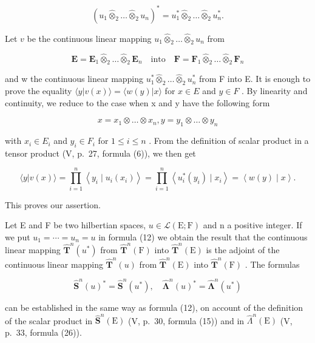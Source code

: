 \[
(u _ {1} \hat {\otimes} _ {2} \dots \hat {\otimes} _ {2} u _ {n}) ^ {*} = u _ {1} ^ {*} \hat {\otimes} _ {2} \dots \hat {\otimes} _ {2} u _ {n} ^ {*}.\tag{12}
\]

Let \(v\) be the continuous linear mapping \(u_1 \hat{\otimes}_2 \ldots \hat{\otimes}_2 u_n\) from

\[
\mathbf {E} = \mathbf {E} _ {1} \hat {\otimes} _ {2} \dots \hat {\otimes} _ {2} \mathbf {E} _ {n} \quad \text {into} \quad \mathbf {F} = \mathbf {F} _ {1} \hat {\otimes} _ {2} \dots \hat {\otimes} _ {2} \mathbf {F} _ {n}
\]

and w the continuous linear mapping \(u_{1}^{*}\hat{\otimes}_{2}\ldots\hat{\otimes}_{2}u_{n}^{*}\) from F into E. It is enough to prove the equality \(\langle y|v(x)\rangle=\langle w(y)|x\rangle\) for \(x\in E\) and \(y\in F\) . By linearity and continuity, we reduce to the case when x and y have the following form

\[
x = x _ {1} \otimes \ldots \otimes x _ {n}, y = y _ {1} \otimes \ldots \otimes y _ {n}
\]

with \(x_{i} \in E_{i}\) and \(y_{i} \in F_{i}\) for \(1 \leqslant i \leqslant n\) . From the definition of scalar product in a tensor product (V, p.~27, formula (6)), we then get

\[
\langle y | v (x) \rangle = \prod_ {i = 1} ^ {n} \left\langle y _ {i} \mid u _ {i} \left(x _ {i}\right) \right\rangle = \prod_ {i = 1} ^ {n} \left\langle u _ {i} ^ {*} \left(y _ {i}\right) \mid x _ {i} \right\rangle = \left\langle w (y) \mid x \right\rangle .
\]

This proves our assertion.

Let E and F be two hilbertian spaces, \(u \in \mathcal{L}(\mathrm{E}; \mathrm{F})\) and n a positive integer. If we put \(u_{1} = \cdots = u_{n} = u\) in formula (12) we obtain the result that the continuous linear mapping \(\hat{\mathbf{T}}^{n}(u^{*})\) from \(\hat{\mathbf{T}}^{n}(\mathrm{F})\) into \(\hat{\mathbf{T}}^{n}(\mathrm{E})\) is the adjoint of the continuous linear mapping \(\hat{\mathbf{T}}^{n}(u)\) from \(\hat{\mathbf{T}}^{n}(\mathrm{E})\) into \(\hat{\mathbf{T}}^{n}(\mathrm{F})\) . The formulas

\[
\hat {\mathbf {S}} ^ {n} (u) ^ {*} = \hat {\mathbf {S}} ^ {n} (u ^ {*}), \quad \hat {\symbf {\Lambda}} ^ {n} (u) ^ {*} = \hat {\symbf {\Lambda}} ^ {n} (u ^ {*})\tag{13}
\]

can be established in the same way as formula (12), on account of the definition of the scalar product in \(\hat{\mathbf{S}}^n (\mathrm{E})\) (V, p.~30, formula (15)) and in \(\hat{\Lambda}^n (\mathrm{E})\) (V, p.~33, formula (26)).

